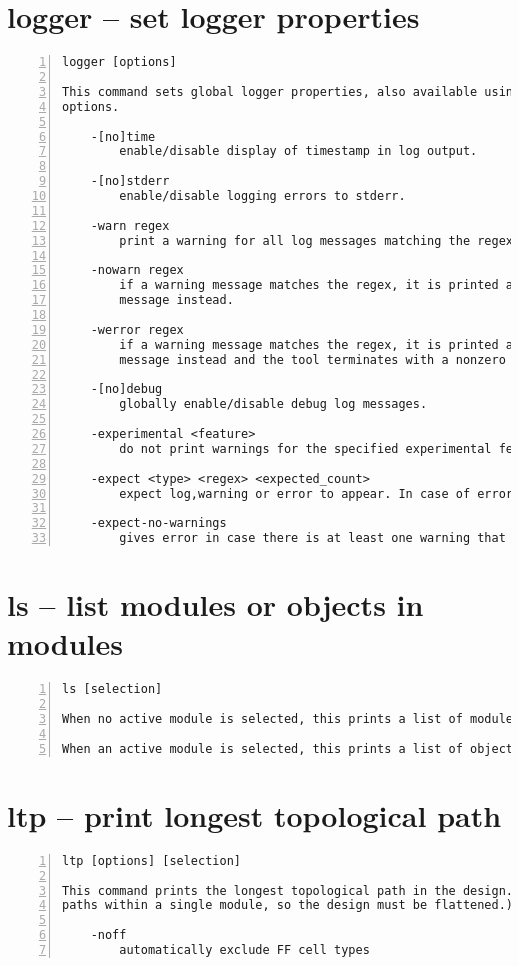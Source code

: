 \section{logger -- set logger properties}
\label{cmd:logger}
\begin{lstlisting}[numbers=left,frame=single]
    logger [options]

This command sets global logger properties, also available using command line
options.

    -[no]time
        enable/disable display of timestamp in log output.

    -[no]stderr
        enable/disable logging errors to stderr.

    -warn regex
        print a warning for all log messages matching the regex.

    -nowarn regex
        if a warning message matches the regex, it is printed as regular
        message instead.

    -werror regex
        if a warning message matches the regex, it is printed as error
        message instead and the tool terminates with a nonzero return code.

    -[no]debug
        globally enable/disable debug log messages.

    -experimental <feature>
        do not print warnings for the specified experimental feature

    -expect <type> <regex> <expected_count>
        expect log,warning or error to appear. In case of error return code is 0.

    -expect-no-warnings
        gives error in case there is at least one warning that is not expected.
\end{lstlisting}

\section{ls -- list modules or objects in modules}
\label{cmd:ls}
\begin{lstlisting}[numbers=left,frame=single]
    ls [selection]

When no active module is selected, this prints a list of modules.

When an active module is selected, this prints a list of objects in the module.
\end{lstlisting}

\section{ltp -- print longest topological path}
\label{cmd:ltp}
\begin{lstlisting}[numbers=left,frame=single]
    ltp [options] [selection]

This command prints the longest topological path in the design. (Only considers
paths within a single module, so the design must be flattened.)

    -noff
        automatically exclude FF cell types
\end{lstlisting}


